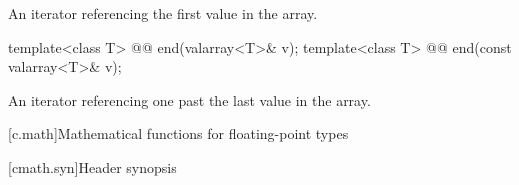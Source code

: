 \begin{itemdescr}
\pnum
\returns
An iterator referencing the first value in the array.
\end{itemdescr}

\begin{indexed}{}
\begin{itemdecl}
template<class T> @@ end(valarray<T>& v);
template<class T> @@ end(const valarray<T>& v);
\end{itemdecl}
\end{indexed}

\begin{itemdescr}
\pnum
\returns
An iterator referencing one past the last value in the array.
\end{itemdescr}

[c.math]{Mathematical functions for floating-point types}

[cmath.syn]{Header  synopsis}

